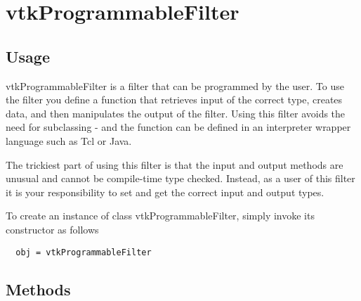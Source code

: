 \section{vtkProgrammableFilter}

\subsection{Usage}

 vtkProgrammableFilter is a filter that can be programmed by the user.  To
 use the filter you define a function that retrieves input of the correct
 type, creates data, and then manipulates the output of the filter.  Using
 this filter avoids the need for subclassing - and the function can be
 defined in an interpreter wrapper language such as Tcl or Java.

 The trickiest part of using this filter is that the input and output
 methods are unusual and cannot be compile-time type checked. Instead, as a
 user of this filter it is your responsibility to set and get the correct
 input and output types.

To create an instance of class vtkProgrammableFilter, simply
invoke its constructor as follows
\begin{verbatim}
  obj = vtkProgrammableFilter
\end{verbatim}
\subsection{Methods}

